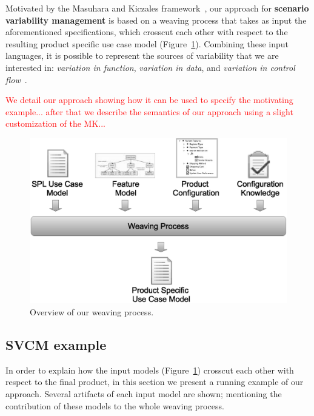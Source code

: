 \documentclass{acm_proc_article-sp}
\begin{document}
Motivated by the Masuhara and Kiczales
framework~\cite{Masuhara:2003aa}, our approach for \textbf{scenario variability
management} is based on a weaving process that takes as input the aforementioned
specifications, which crosscut each other with respect to the resulting product
specific use case model (Figure~\ref{fig:weave-process}). Combining these input
languages, it is possible to represent the sources of variability that we are
interested in: \emph{variation in function}, \emph{variation in data}, and
\emph{variation in control flow}~\cite{Bachmann:2001aa}.

\textcolor{red}{
We detail our approach showing how it
can be used to specify the motivating example... 
after that we describe the semantics of our approach using a slight
customization of the MK...
}

\begin{figure}[htb]
 \begin{center}
  \includegraphics[scale=0.30]{img/weave-process2.eps}
  \caption{Overview of our weaving process.}
  \label{fig:weave-process}
  \end{center}
\end{figure}

\subsection{SVCM example}
\label{sub:running}

In order to explain how the input models (Figure~\ref{fig:weave-process})
crosscut each other with respect to the final product, in this section we
present a running example of our approach. Several artifacts of each input model
are shown; mentioning the contribution of these models to the whole weaving
process.
\end{document}
